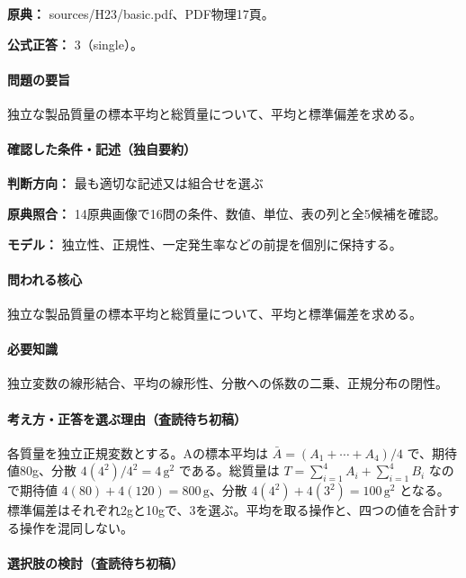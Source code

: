 \noindent\textbf{原典：} sources/H23/basic.pdf、PDF物理17頁。

\textbf{公式正答：} 3（single）。

\paragraph{問題の要旨} 独立な製品質量の標本平均と総質量について、平均と標準偏差を求める。

\paragraph{確認した条件・記述（独自要約）}\mbox{}\par

\noindent\textbf{判断方向：} 最も適切な記述又は組合せを選ぶ\par

\noindent\textbf{原典照合：} 14原典画像で16問の条件、数値、単位、表の列と全5候補を確認。\par

\noindent\textbf{モデル：} 独立性、正規性、一定発生率などの前提を個別に保持する。\par

\paragraph{問われる核心} 独立な製品質量の標本平均と総質量について、平均と標準偏差を求める。

\paragraph{必要知識} 独立変数の線形結合、平均の線形性、分散への係数の二乗、正規分布の閉性。

\paragraph{考え方・正答を選ぶ理由（査読待ち初稿）} 各質量を独立正規変数とする。Aの標本平均は \(\bar A=(A_1+\cdots+A_4)/4\) で、期待値80g、分散 \(4(4^2)/4^2=4\,\mathrm{g^2}\) である。総質量は \(T=\sum_{i=1}^4A_i+\sum_{i=1}^4B_i\) なので期待値 \(4(80)+4(120)=800\,\mathrm g\)、分散 \(4(4^2)+4(3^2)=100\,\mathrm{g^2}\) となる。標準偏差はそれぞれ2gと10gで、3を選ぶ。平均を取る操作と、四つの値を合計する操作を混同しない。

\paragraph{選択肢の検討（査読待ち初稿）}\mbox{}\par

